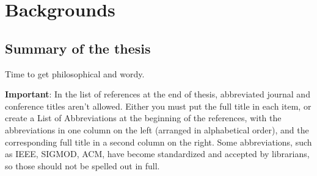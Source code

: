 \chapter{Backgrounds}
\label{chapter:Backgrounds}
\thispagestyle{myheadings}

\graphicspath{{5_Chapter_Backgrounds/Figures/}}

\section{Summary of the thesis}

Time to get philosophical and wordy.

{\bf Important}: In the list of references at the end of thesis, abbreviated journal and conference titles aren't allowed. Either you must put the full title in each item, or create a List of Abbreviations at the beginning of the references, with the abbreviations in one column on the left (arranged in alphabetical order), and the corresponding full title in a second column on the right.  Some abbreviations, such as IEEE, SIGMOD, ACM, have become standardized and accepted by librarians, so those should not be spelled out in full.